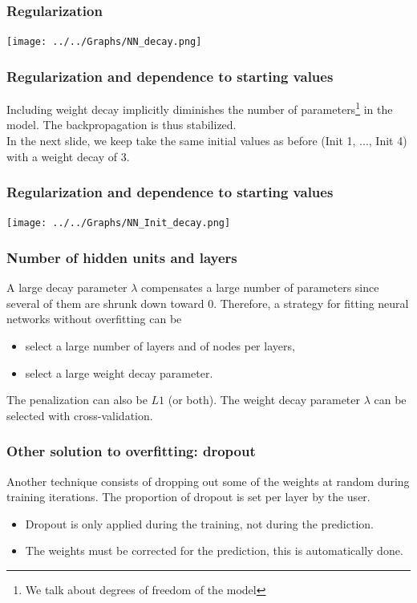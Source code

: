 \begin{frame}
\frametitle{Regularization}
\begin{center}
\texttt{[image: ../../Graphs/NN\_decay.png]}
\end{center} 
\end{frame}
\begin{frame}
\frametitle{Regularization and dependence to starting values}
Including weight decay implicitly diminishes the number of parameters\footnote{We talk about degrees of freedom of the model} in the model. The backpropagation is thus stabilized. \\
\vspace{0.3cm}
In the next slide, we keep take the same initial values as before (Init 1, ..., Init 4) with a weight decay of 3. 
\end{frame}
\begin{frame}
\frametitle{Regularization and dependence to starting values}
\begin{center}
\texttt{[image: ../../Graphs/NN\_Init\_decay.png]}
\end{center} 
\end{frame}
\begin{frame}
\frametitle{Number of hidden units and layers}
A large decay parameter $\lambda$ compensates a large number of parameters since several of them are shrunk down toward $0$. Therefore, a strategy for fitting neural networks without overfitting can be
\begin{itemize}
\item select a large number of layers and of nodes per layers,
\item select a large weight decay parameter.
\end{itemize}
The penalization can also be $L1$ (or both). The weight decay parameter $\lambda$ can be selected with cross-validation.
\end{frame}
\begin{frame}
\frametitle{Other solution to overfitting: dropout}
Another technique consists of dropping out some of the weights at random during training iterations. The proportion of dropout is set per layer by the user. 
\begin{itemize}
\item Dropout is only applied during the training, not during the prediction.
\item The weights must be corrected for the prediction, this is automatically done.
\end{itemize}
\end{frame}
 

